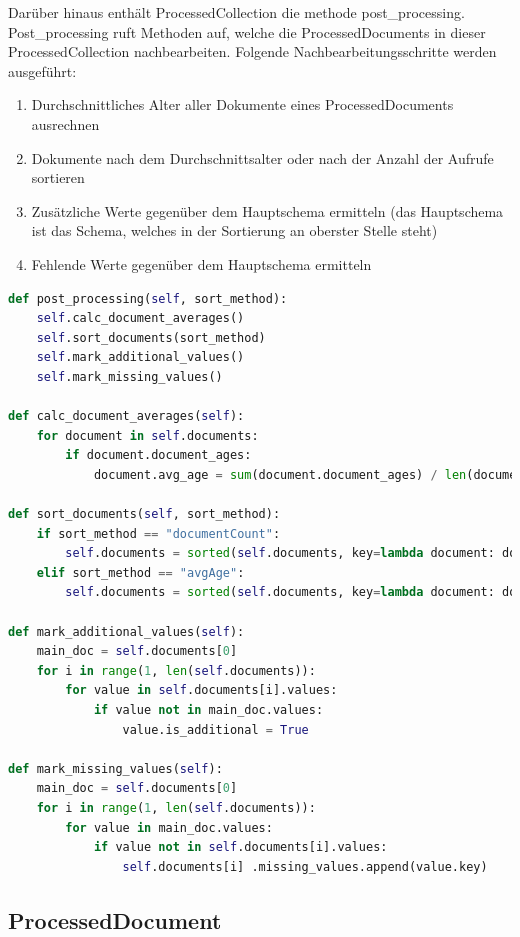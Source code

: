 Darüber hinaus enthält ProcessedCollection die methode post\_processing.
Post\_processing ruft Methoden auf, welche die ProcessedDocuments in dieser ProcessedCollection nachbearbeiten.
Folgende Nachbearbeitungsschritte werden ausgeführt:
\begin{enumerate}
    \item Durchschnittliches Alter aller Dokumente eines ProcessedDocuments ausrechnen
    \item Dokumente nach dem Durchschnittsalter oder nach der Anzahl der Aufrufe sortieren
    \item Zusätzliche Werte gegenüber dem Hauptschema ermitteln (das Hauptschema ist das Schema, welches in der Sortierung an oberster Stelle steht)
    \item Fehlende Werte gegenüber dem Hauptschema ermitteln
\end{enumerate}

\begin{lstlisting}[language=python, caption={ProcessedCollection.post\_processing},label={lst:backend_post_processing}]
def post_processing(self, sort_method):
    self.calc_document_averages()
    self.sort_documents(sort_method)
    self.mark_additional_values()
    self.mark_missing_values()

def calc_document_averages(self):
    for document in self.documents:
        if document.document_ages:
            document.avg_age = sum(document.document_ages) / len(document.document_ages)

def sort_documents(self, sort_method):
    if sort_method == "documentCount":
        self.documents = sorted(self.documents, key=lambda document: document.count, reverse=True)
    elif sort_method == "avgAge":
        self.documents = sorted(self.documents, key=lambda document: document.avg_age, reverse=True)

def mark_additional_values(self):
    main_doc = self.documents[0]
    for i in range(1, len(self.documents)):
        for value in self.documents[i].values:
            if value not in main_doc.values:
                value.is_additional = True

def mark_missing_values(self):
    main_doc = self.documents[0]
    for i in range(1, len(self.documents)):
        for value in main_doc.values:
            if value not in self.documents[i].values:
                self.documents[i] .missing_values.append(value.key)
\end{lstlisting}

\subsection{ProcessedDocument}
\label{sub:ba_processed_document}


